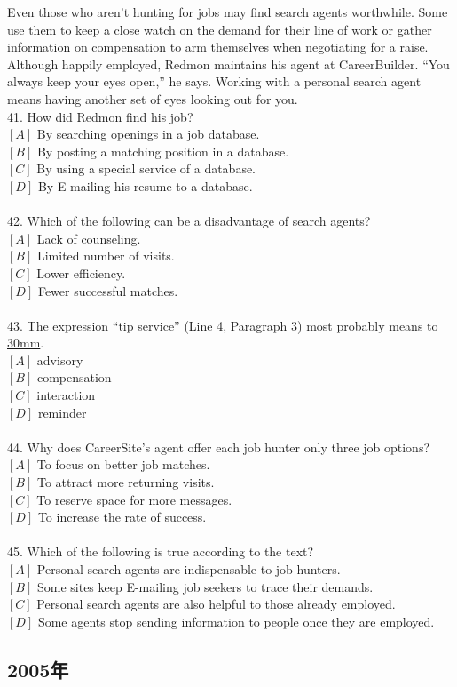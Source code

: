 \documentclass[a4paper]{article}
\begin{document}
\par
Even those who aren’t hunting for jobs may find search agents worthwhile. Some use them to keep a close watch on the demand for their line of work or gather information on compensation to arm themselves when negotiating for a raise. Although happily employed, Redmon maintains his agent at CareerBuilder. “You always keep your eyes open,” he says. Working with a personal search agent means having another set of eyes looking out for you.
\\41.	How did Redmon find his job?\\$[A]$ By searching openings in a job database.\\$[B]$ By posting a matching position in a database.\\$[C]$ By using a special service of a database.\\$[D]$ By E-mailing his resume to a database.\\\\42.	Which of the following can be a disadvantage of search agents?\\$[A]$ Lack of counseling.\\$[B]$ Limited number of visits.\\$[C]$ Lower efficiency.\\$[D]$ Fewer successful matches.\\\\43.	The expression “tip service” (Line 4, Paragraph 3) most probably means \underline{\hbox to 30mm{}}.\\$[A]$ advisory\\$[B]$ compensation\\$[C]$ interaction\\$[D]$ reminder\\\\44.	Why does CareerSite’s agent offer each job hunter only three job options?\\$[A]$ To focus on better job matches.\\$[B]$ To attract more returning visits.\\$[C]$ To reserve space for more messages.\\$[D]$ To increase the rate of success.\\\\45.	Which of the following is true according to the text?\\$[A]$ Personal search agents are indispensable to job-hunters.\\$[B]$ Some sites keep E-mailing job seekers to trace their demands.\\$[C]$ Personal search agents are also helpful to those already employed.\\$[D]$ Some agents stop sending information to people once they are employed.\\\subsection{2005年}
\end{document}

